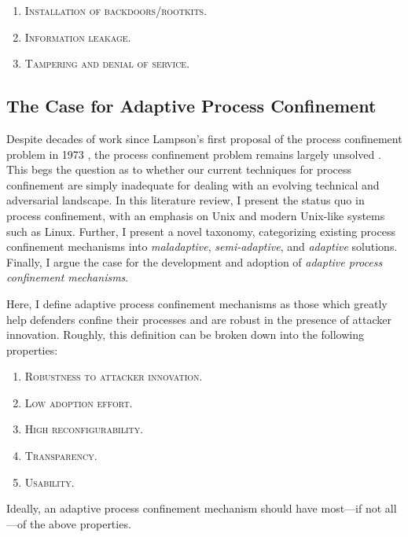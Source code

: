 \documentclass[dvipsnames, 12pt]{article}
\begin{document}
\begin{enumerate}[label=\bfseries G\arabic*., ref=G\arabic*, labelindent=2em]
    \item \label{g:1} \textsc{Installation of backdoors/rootkits.} 

    \item \label{g:2} \textsc{Information leakage.} 

    \item \label{g:3} \textsc{Tampering and denial of service.} 
\end{enumerate}


\subsection{The Case for Adaptive Process Confinement}

Despite decades of work since Lampson's first proposal of the process
confinement problem in 1973 \cite{lampson1973_a_note}, the process confinement
problem remains largely unsolved \cite{crowell2013_confinement_problem}. This
begs the question as to whether our current techniques for process confinement
are simply inadequate for dealing with an evolving technical and adversarial
landscape. In this literature review, I present the status quo in process
confinement, with an emphasis on Unix and modern Unix-like systems such as
Linux.  Further, I present a novel taxonomy, categorizing existing process
confinement mechanisms into \textit{maladaptive}, \textit{semi-adaptive}, and
\textit{adaptive} solutions. Finally, I argue the case for the development and
adoption of \textit{adaptive process confinement mechanisms}.

Here, I define adaptive process confinement mechanisms as those which greatly
help defenders confine their processes and are robust in the presence of
attacker innovation. Roughly, this definition can be broken down into the
following properties:
\begin{enumerate}[label=\bfseries P\arabic*., ref=P\arabic*, labelindent=2em]
    \item \label{p:1} \scshape{Robustness to attacker innovation.} 
    \item \label{p:2} \scshape{Low adoption effort.} 
    \item \label{p:3} \scshape{High reconfigurability.} 
    \item \label{p:4} \scshape{Transparency.} 
    \item \label{p:5} \scshape{Usability.} 
\end{enumerate}
Ideally, an adaptive process confinement mechanism should have most---if not
all---of the above properties.
\end{document}
